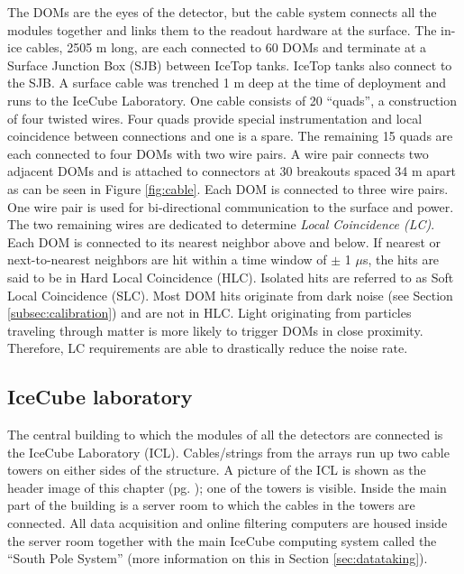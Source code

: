 The DOMs are the eyes of the detector, but the cable system connects all the modules together and links them to the readout hardware at the surface. The in-ice cables, 2505 m long, are each connected to 60 DOMs and terminate at a Surface Junction Box (SJB) between IceTop tanks. IceTop tanks also connect to the SJB. A surface cable was trenched 1 m deep at the time of deployment and runs to the IceCube Laboratory. One cable consists of 20 ``quads'', a construction of four twisted wires. Four quads provide special instrumentation and local coincidence between connections and one is a spare. The remaining 15 quads are each connected to four DOMs with two wire pairs. A wire pair connects two adjacent DOMs and is attached to connectors at 30 breakouts spaced 34 m apart as can be seen in Figure \ref{fig:cable}. Each DOM is connected to three wire pairs. One wire pair is used for bi-directional communication to the surface and power. The two remaining wires are dedicated to determine \textit{Local Coincidence (LC)}. Each DOM is connected to its nearest neighbor above and below. If nearest or next-to-nearest neighbors are hit within a time window of $\pm$ 1 $\mu$s, the hits are said to be in Hard Local Coincidence (HLC). Isolated hits are referred to as Soft Local Coincidence (SLC). Most DOM hits originate from dark noise (see Section \ref{subsec:calibration}) and are not in HLC. Light originating from particles traveling through matter is more likely to trigger DOMs in close proximity. Therefore, LC requirements are able to drastically reduce the noise rate.

\subsection{IceCube laboratory}
\label{subsec:icl}
The central building to which the modules of all the detectors are connected is the IceCube Laboratory (ICL). Cables/strings from the arrays run up two cable towers on either sides of the structure. A picture of the ICL is shown as the header image of this chapter (pg. \pageref{ch:icecube}); one of the towers is visible. Inside the main part of the building is a server room to which the cables in the towers are connected. All data acquisition and online filtering computers are housed inside the server room together with the main IceCube computing system called the ``South Pole System'' (more information on this in Section \ref{sec:datataking}).


